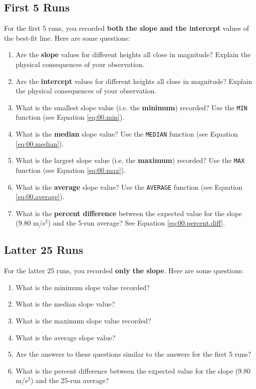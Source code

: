 \subsection{First 5 Runs} \label{sec:01.first.5}
%
For the first 5 runs, you recorded \textbf{both the slope and the intercept} values of the best-fit line. Here are some questions:
\begin{enumerate}
    \item Are the \textbf{slope} values for different heights all close in magnitude? Explain the physical consequences of your observation.
    \item Are the \textbf{intercept} values for different heights all close in magnitude? Explain the physical consequences of your observation.
    \item What is the smallest slope value (i.e. the \textbf{minimum}) recorded? Use the \texttt{MIN} function (see Equation \ref{eq:00.min}).
    \item What is the \textbf{median} slope value? Use the \texttt{MEDIAN} function (see Equation \ref{eq:00.median}).
    \item What is the largest slope value (i.e. the \textbf{maximum}) recorded? Use the \texttt{MAX} function (see Equation \ref{eq:00.max}).
    \item What is the \textbf{average} slope value? Use the \texttt{AVERAGE} function (see Equation \ref{eq:00.average}).
    \item What is the \textbf{percent difference} between the expected value for the slope (9.80 m/s$^{2}$) and the 5-run average? See Equation \ref{eq:00.percent.diff}.
\end{enumerate}
%
\subsection{Latter 25 Runs} \label{sec:01.latter.25}
%
For the latter 25 runs, you recorded \textbf{only the slope}. Here are some questions:
\begin{enumerate}
    \item What is the minimum slope value recorded?
    \item What is the median slope value?
    \item What is the maximum slope value recorded?
    \item What is the average slope value?
    \item Are the answers to these questions similar to the answers for the first 5 runs?
    \item What is the percent difference between the expected value for the slope (9.80 m/s$^{2}$) and the 25-run average?
\end{enumerate}
%
